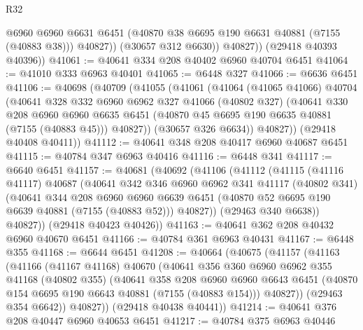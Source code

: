 \begin{lexlean}{R32}
\begin{coremodule}
                @6960
                @6960
                @6631
                @6451
                (@40870 @38 @6695 @190 @6631 @40881 (@7155 (@40883 @38)))
                @40827))
            (@30657 @312 @6630))
          @40827))
      (@29418 @40393 @40396))
@41061 := @40641 @334 @208 @40402 @6960 @40704 @6451
@41064 := @41010 @333 @6963 @40401
@41065 := @6448 @327
@41066 := @6636 @6451
@41106 := @40698
    (@40709
      (@41055
        (@41061
          (@41064
            (@41065 @41066)
            @40704
            (@40641
              @328
              @332
              @6960
              @6962
              @327
              @41066
              (@40802 @327)
              (@40641
                @330
                @208
                @6960
                @6960
                @6635
                @6451
                (@40870 @45 @6695 @190 @6635 @40881 (@7155 (@40883 @45)))
                @40827))
            (@30657 @326 @6634))
          @40827))
      (@29418 @40408 @40411))
@41112 := @40641 @348 @208 @40417 @6960 @40687 @6451
@41115 := @40784 @347 @6963 @40416
@41116 := @6448 @341
@41117 := @6640 @6451
@41157 := @40681
    (@40692
      (@41106
        (@41112
          (@41115
            (@41116 @41117)
            @40687
            (@40641
              @342
              @346
              @6960
              @6962
              @341
              @41117
              (@40802 @341)
              (@40641
                @344
                @208
                @6960
                @6960
                @6639
                @6451
                (@40870 @52 @6695 @190 @6639 @40881 (@7155 (@40883 @52)))
                @40827))
            (@29463 @340 @6638))
          @40827))
      (@29418 @40423 @40426))
@41163 := @40641 @362 @208 @40432 @6960 @40670 @6451
@41166 := @40784 @361 @6963 @40431
@41167 := @6448 @355
@41168 := @6644 @6451
@41208 := @40664
    (@40675
      (@41157
        (@41163
          (@41166
            (@41167 @41168)
            @40670
            (@40641
              @356
              @360
              @6960
              @6962
              @355
              @41168
              (@40802 @355)
              (@40641
                @358
                @208
                @6960
                @6960
                @6643
                @6451
                (@40870 @154 @6695 @190 @6643 @40881 (@7155 (@40883 @154)))
                @40827))
            (@29463 @354 @6642))
          @40827))
      (@29418 @40438 @40441))
@41214 := @40641 @376 @208 @40447 @6960 @40653 @6451
@41217 := @40784 @375 @6963 @40446

\end{coremodule}
\end{lexlean}
